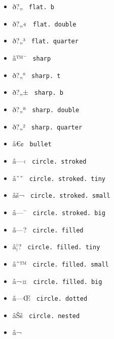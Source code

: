 \begin{itemize}
\item
  \label{symbol-flat.b}{{ ð?„­ } \texttt{\ flat.\ b\ }}
\item
  \label{symbol-flat.double}{{ ð?„« }
  \texttt{\ flat.\ double\ }}
\item
  \label{symbol-flat.quarter}{{ ð?„³ }
  \texttt{\ flat.\ quarter\ }}
\item
  \label{symbol-sharp}{{ â™¯ } \texttt{\ sharp\ }}
\item
  \label{symbol-sharp.t}{{ ð?„° } \texttt{\ sharp.\ t\ }}
\item
  \label{symbol-sharp.b}{{ ð?„± } \texttt{\ sharp.\ b\ }}
\item
  \label{symbol-sharp.double}{{ ð?„ª }
  \texttt{\ sharp.\ double\ }}
\item
  \label{symbol-sharp.quarter}{{ ð?„² }
  \texttt{\ sharp.\ quarter\ }}
\item
  \label{symbol-bullet}{{ â€¢ } \texttt{\ bullet\ }}
\item
  \label{symbol-circle.stroked}{{ â---‹ }
  \texttt{\ circle.\ stroked\ }}
\item
  \label{symbol-circle.stroked.tiny}{{ âˆ˜ }
  \texttt{\ circle.\ stroked.\ tiny\ }}
\item
  \label{symbol-circle.stroked.small}{{ âš¬ }
  \texttt{\ circle.\ stroked.\ small\ }}
\item
  \label{symbol-circle.stroked.big}{{ â---¯ }
  \texttt{\ circle.\ stroked.\ big\ }}
\item
  \label{symbol-circle.filled}{{ â---? }
  \texttt{\ circle.\ filled\ }}
\item
  \label{symbol-circle.filled.tiny}{{ â¦? }
  \texttt{\ circle.\ filled.\ tiny\ }}
\item
  \label{symbol-circle.filled.small}{{ âˆ™ }
  \texttt{\ circle.\ filled.\ small\ }}
\item
  \label{symbol-circle.filled.big}{{ â¬¤ }
  \texttt{\ circle.\ filled.\ big\ }}
\item
  \label{symbol-circle.dotted}{{ â---Œ }
  \texttt{\ circle.\ dotted\ }}
\item
  \label{symbol-circle.nested}{{ âŠš }
  \texttt{\ circle.\ nested\ }}
\item
  \label{symbol-ellipse.stroked.h}{{ â¬­ }
}
\end{itemize}
